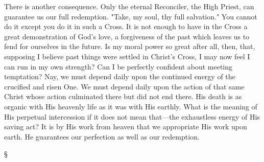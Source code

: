 \documentclass[12pt,letterpaper,oneside]{book}
\begin{document}
There is another consequence. Only the 
eternal Reconciler, the High Priest, can 
guarantee us our full redemption. "Take, my 
soul, thy full salvation." You cannot do it 
except you do it in such a Cross. It is not 
enough to have in the Cross a great demonstration 
of God's love, a forgiveness of the 
past which leaves us to fend for ourselves in 
the future. Is my moral power so great after 
all, then, that, supposing I believe past things 
were settled in Christ's Cross, I may now feel 
I can run in my own strength? Can I be 
perfectly confident about meeting temptation? 
Nay, we must depend daily upon the continued 
energy of the crucified and risen One. We 
must depend daily upon the action of that 
same Christ whose action culminated there 
but did not end there. His death is as organic 
with His heavenly life as it was with His 
earthly. What is the meaning of His perpetual 
intercession if it does not mean that---the 
exhaustless energy of His saving act? It is 
by His work from heaven that we appropriate 
His work upon earth. He guarantees our perfection 
as well as our redemption. 

\begin{center}
\S
\end{center}
\end{document}
